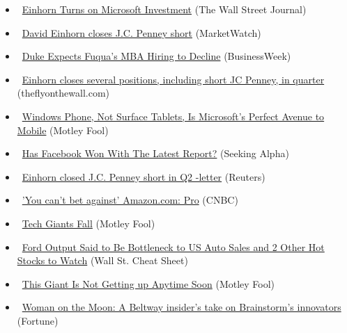 \documentclass[11pt,asymmetric]{article}
\begin{document}
\begin{itemize}
\item\ \href{http://blogs.wsj.com/moneybeat/2013/07/26/einhorn-turns-on-microsoft-investment/?mod=yahoo_hs}{Einhorn Turns on Microsoft Investment} (The Wall Street Journal)
\item\ \href{http://www.marketwatch.com/News/Story/Story.aspx?guid=2E7DBF3F-CEE3-49B7-9B70-C13FD0ADBC0D&siteid=yhoof2}{David Einhorn closes J.C. Penney short} (MarketWatch)
\item\ \href{http://www.businessweek.com/articles/2013-07-26/fuqua-mba-hiring-expected-to-decline?campaign_id=yhoo}{Duke Expects Fuqua’s MBA Hiring to Decline} (BusinessWeek)
\item\ \href{http://finance.yahoo.com/news/einhorn-closes-several-positions-including-181708416.html}{Einhorn closes several positions, including short JC Penney, in quarter} (theflyonthewall.com)
\item\ \href{http://beta.fool.com/nmaithya/2013/07/26/windows-phone-not-surface-rt-is-microsofts-perfect/40916/?source=eogyholnk0000001}{Windows Phone, Not Surface Tablets, Is Microsoft's Perfect Avenue to Mobile} (Motley Fool)
\item\ \href{http://seekingalpha.com/article/1576652-has-facebook-won-with-the-latest-report?source=yahoo}{Has Facebook Won With The Latest Report?} (Seeking Alpha)
\item\ \href{http://www.reuters.com/article/2013/07/26/hedgefunds-performance-einhorn-idUSL1N0FW17Z20130726?type=companyNews&feedType=RSS&feedName=companyNews&rpc=43}{Einhorn closed J.C. Penney short in Q2 -letter} (Reuters)
\item\ \href{http://www.cnbc.com/id/100917617?__source=yahoo%7Cfinance%7Cheadline%7Cheadline%7Cstory&par=yahoo&doc=100917617%7C%27You+can%27t+bet+against%27+A}{'You can't bet against' Amazon.com: Pro} (CNBC)
\item\ \href{http://beta.fool.com/callumturcan/2013/07/26/tech-giants-fall/41327/?source=eogyholnk0000001}{Tech Giants Fall} (Motley Fool)
\item\ \href{http://wallstcheatsheet.com/stocks/ford-output-said-to-be-bottleneck-to-us-auto-sales-and-2-other-hot-stocks-to-watch.html/?ref=YF}{Ford Output Said to Be Bottleneck to US Auto Sales and 2 Other Hot Stocks to Watch} (Wall St. Cheat Sheet)
\item\ \href{http://beta.fool.com/mihirmehta/2013/07/26/this-giant-is-not-getting-up-anytime-soon/41361/?source=eogyholnk0000001}{This Giant Is Not Getting up Anytime Soon} (Motley Fool)
\item\ \href{http://tech.fortune.cnn.com/2013/07/26/woman-on-the-moon-a-beltway-insiders-take-on-brainstorms-innovators/?source=yahoo_quote}{Woman on the Moon: A Beltway insider's take on Brainstorm's innovators} (Fortune)

\end{itemize}
\end{document}
